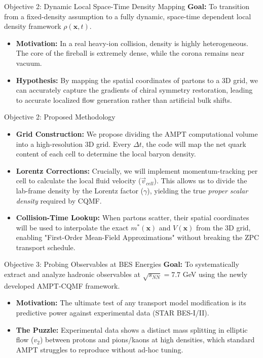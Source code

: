 \documentclass[aspectratio=169]{beamer}
\begin{document}
\begin{frame}{Objective 2: Dynamic Local Space-Time Density Mapping}
    \textbf{Goal:} To transition from a fixed-density assumption to a fully dynamic, space-time dependent local density framework $\rho(\mathbf{x}, t)$.
    \vspace{0.3cm}
    \begin{itemize}
        \item \textbf{Motivation:} In a real heavy-ion collision, density is highly heterogeneous. The core of the fireball is extremely dense, while the corona remains near vacuum.
        \item \textbf{Hypothesis:} By mapping the spatial coordinates of partons to a 3D grid, we can accurately capture the gradients of chiral symmetry restoration, leading to accurate localized flow generation rather than artificial bulk shifts.
    \end{itemize}
\end{frame}

\begin{frame}{Objective 2: Proposed Methodology}
    \begin{itemize}
        \item \textbf{Grid Construction:} We propose dividing the AMPT computational volume into a high-resolution 3D grid. Every $\Delta t$, the code will map the net quark content of each cell to determine the local baryon density.
        \item \textbf{Lorentz Corrections:} Crucially, we will implement momentum-tracking per cell to calculate the local fluid velocity ($\vec{v}_{cell}$). This allows us to divide the lab-frame density by the Lorentz factor ($\gamma$), yielding the true \textit{proper scalar density} required by CQMF.
        \item \textbf{Collision-Time Lookup:} When partons scatter, their spatial coordinates will be used to interpolate the exact $m^*(\mathbf{x})$ and $V(\mathbf{x})$ from the 3D grid, enabling "First-Order Mean-Field Approximations" without breaking the ZPC transport schedule.
    \end{itemize}
\end{frame}

\begin{frame}{Objective 3: Probing Observables at BES Energies}
    \textbf{Goal:} To systematically extract and analyze hadronic observables at $\sqrt{s_{NN}} = 7.7$ GeV using the newly developed AMPT-CQMF framework.
    \vspace{0.3cm}
    \begin{itemize}
        \item \textbf{Motivation:} The ultimate test of any transport model modification is its predictive power against experimental data (STAR BES-I/II).
        \item \textbf{The Puzzle:} Experimental data shows a distinct mass splitting in elliptic flow ($v_2$) between protons and pions/kaons at high densities, which standard AMPT struggles to reproduce without ad-hoc tuning.
    \end{itemize}
\end{frame}
\end{document}
